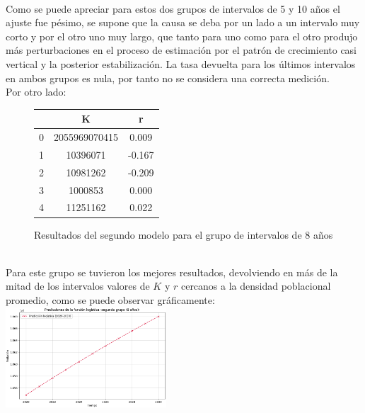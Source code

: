 \documentclass[a4paper,10pt,twocolumn]{article}
\begin{document}
\\
Como se puede apreciar para estos dos grupos de intervalos de 5 y 10 años el ajuste fue pésimo, se supone que la causa se deba por un lado a un intervalo muy corto y por el otro uno muy largo, que tanto para uno como para el otro produjo más perturbaciones en el proceso de estimación por el patrón de crecimiento casi vertical y la posterior estabilización. La tasa devuelta para los últimos intervalos en ambos grupos es nula, por tanto no se considera una correcta medición.\\
Por otro lado:\\
\begin{figure}[h!]%
	\begin{center}
		\begin{tabular}{|c|c|c|} \hline
					 & K 			& r 		\\ \hline
			0		 & 2055969070415& 0.009		\\ \hline
			1		 & 10396071	    & -0.167	\\ \hline
			2		 & 10981262	    & -0.209	\\ \hline
			3		 & 1000853	    & 0.000		\\ \hline
			4		 & 11251162	    & 0.022		\\ \hline
		\end{tabular}
	\caption{Resultados del segundo modelo para el grupo de intervalos de 8 años \label{fig:ex}}
	\end{center}
\end{figure}
\\
Para este grupo se tuvieron los mejores resultados, devolviendo en más de la mitad de los intervalos valores de $K$ y $r$ cercanos a la densidad poblacional promedio, como se puede observar gráficamente:
\includegraphics[width=0.45\textwidth]{img/df8_graph.png}
\\
\end{document}
